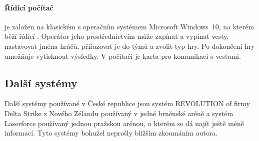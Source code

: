 \paragraph{Řídící počítač}
je založen na klasickém  s operačním systémem Microsoft Windows~10, na kterém běží řídící . Operátor jeho prostřednictvím může zapínat a vypínat vesty, nastavovat jména hráčů, přiřazovat je do týmů a zvolit typ hry. Po dokončení hry umožňuje  vytisknout výsledky. V počítači je  karta pro komunikaci s vestami.


\subsection{Další systémy}
Další systémy používané v České republice jsou systém REVOLUTION of firmy Delta Strike z Nového Zélandu používaný v jedné brněnské aréně a systém Laserforce používaný jednou pražskou arénou, o kterém se dá najít ještě méně informací. Tyto systémy bohužel neprošly bližším zkoumáním autora.
